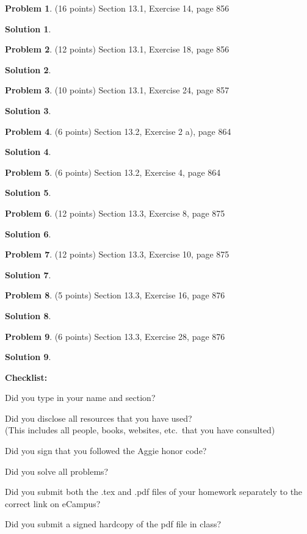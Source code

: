 \documentclass{article}
\theoremstyle{definition}
\newtheorem{problem}{Problem}
\newtheorem*{solution}{Solution}
\newcommand{\checklist}{\noindent\textbf{Checklist:}
\begin{compactitem}[$\Box$] 
\item Did you type in your name and section? 
\item Did you disclose all resources that you have used? \\
(This includes all people, books, websites, etc.\ that you have consulted)
\item Did you sign that you followed the Aggie honor code? 
\item Did you solve all problems? 
\item Did you submit both the .tex and .pdf files of your homework separately 
to the correct link on eCampus?
\item Did you submit a signed hardcopy of the pdf file in class? 
\end{compactitem}
}
\begin{document}
\begin{problem} (16 points)
Section 13.1, Exercise 14, page 856
\end{problem}
\begin{solution} 
\end{solution}

\begin{problem} (12 points)
Section 13.1, Exercise 18, page 856
\end{problem}
\begin{solution} 
\end{solution}

\begin{problem} (10 points)
Section 13.1, Exercise 24, page 857
\end{problem}
\begin{solution} 
\end{solution}

\begin{problem} (6 points)
Section 13.2, Exercise 2 a), page 864
\end{problem}
\begin{solution} 
\end{solution}

\begin{problem} (6 points)
Section 13.2, Exercise 4, page 864
\end{problem}
\begin{solution} 
\end{solution}

\begin{problem} (12 points)
Section 13.3, Exercise 8, page 875
\end{problem}
\begin{solution} 
\end{solution}

\begin{problem} (12 points)
Section 13.3, Exercise 10, page 875
\end{problem}
\begin{solution} 
\end{solution}

\begin{problem} (5 points)
Section 13.3, Exercise 16, page 876
\end{problem}
\begin{solution} 
\end{solution}

\begin{problem} (6 points)
Section 13.3, Exercise 28, page 876
\end{problem}
\begin{solution} 
\end{solution}

\goodbreak
\checklist
\end{document}
